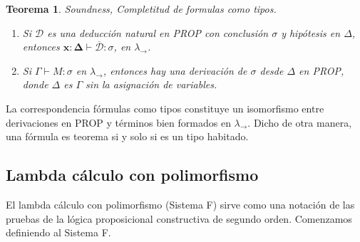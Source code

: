 \documentclass[a4paper,11pt]{article}
\newtheorem{theorem}{Teorema}
\theoremstyle{definition}
\begin{document}
\begin{theorem}
  Soundness, Completitud de formulas como tipos.

  \begin{enumerate}
  \item Si $\mathcal{D}$ es una deducción natural en PROP con conclusión $\sigma$ y hipótesis en $\Delta$, entonces
    $\bm{x}:\bm{\Delta} \vdash \overline{\mathcal{D}} : \sigma$, en $\lambda_{\rightarrow}$.
  \item Si $\Gamma \vdash M : \sigma$ en $\lambda_{\rightarrow}$, entonces hay una derivación de $\sigma$ desde $\Delta$ en PROP,
    donde $\Delta$ es $\Gamma$ sin la asignación de variables.
  \end{enumerate}

\end{theorem}

La correspondencia fórmulas como tipos constituye un isomorfismo entre derivaciones en PROP y términos bien formados en $\lambda_{\rightarrow}$.
Dicho de otra manera, una fórmula es teorema si y solo si es un tipo habitado.

\subsection{Lambda cálculo con polimorfismo}
\label{Lambda cálculo con polimorfismo}

El lambda cálculo con polimorfismo (Sistema F) sirve como una notación de las pruebas de la lógica proposicional constructiva
de segundo orden.
Comenzamos definiendo al Sistema F.
\end{document}
